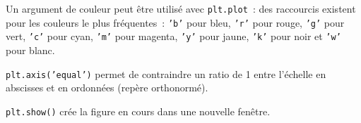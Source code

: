 Un argument de couleur peut être utilisé avec \texttt{plt.plot}~: des raccourcis existent pour les couleurs le plus fréquentes~: \texttt{'b'} pour bleu, \texttt{'r'} pour rouge, \texttt{'g'} pour vert, \texttt{'c'} pour cyan, \texttt{'m'} pour magenta, \texttt{'y'} pour jaune, \texttt{'k'} pour noir et \texttt{'w'} pour blanc. 

\texttt{plt.axis('equal')} permet de contraindre un ratio de 1 entre l'échelle en abscisses et en ordonnées (repère orthonormé).

\texttt{plt.show()} crée la figure en cours dans une nouvelle fenêtre. 
 







